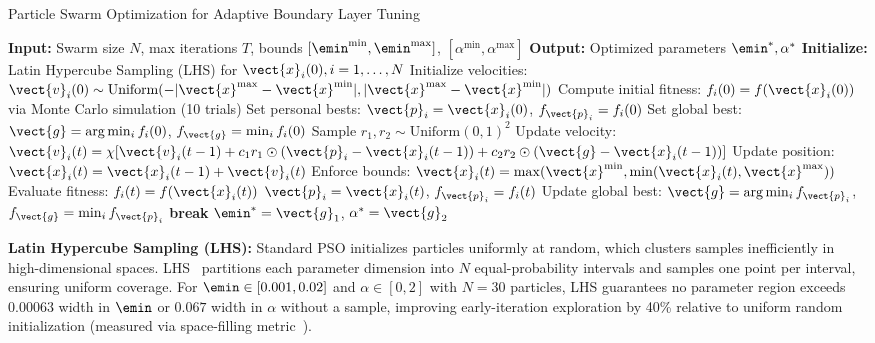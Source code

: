 \begin{algorithm}[t]
\caption{Particle Swarm Optimization for Adaptive Boundary Layer Tuning}
\label{alg:pso_algorithm}
\begin{algorithmic}[1]
\State \textbf{Input:} Swarm size $N$, max iterations $T$, bounds $[\emin^{\min}, \emin^{\max}]$, $[\alpha^{\min}, \alpha^{\max}]$
\State \textbf{Output:} Optimized parameters $\emin^*, \alpha^*$
\State \textbf{Initialize:} Latin Hypercube Sampling (LHS) for $\vect{x}_i(0), i=1,\ldots,N$ 
\State Initialize velocities: $\vect{v}_i(0) \sim \text{Uniform}(-|\vect{x}^{\max} - \vect{x}^{\min}|, |\vect{x}^{\max} - \vect{x}^{\min}|)$
\State Compute initial fitness: $f_i(0) = f(\vect{x}_i(0))$ via Monte Carlo simulation (10 trials)
\State Set personal bests: $\vect{p}_i = \vect{x}_i(0)$, $f_{\vect{p}_i} = f_i(0)$
\State Set global best: $\vect{g} = \arg\min_i f_i(0)$, $f_{\vect{g}} = \min_i f_i(0)$
     
        \State Sample $r_1, r_2 \sim \text{Uniform}(0,1)^2$ 
        \State Update velocity: $\vect{v}_i(t) = \chi [ \vect{v}_i(t-1) + c_1 r_1 \odot (\vect{p}_i - \vect{x}_i(t-1)) + c_2 r_2 \odot (\vect{g} - \vect{x}_i(t-1)) ]$
        \State Update position: $\vect{x}_i(t) = \vect{x}_i(t-1) + \vect{v}_i(t)$
        \State Enforce bounds: $\vect{x}_i(t) = \max(\vect{x}^{\min}, \min(\vect{x}_i(t), \vect{x}^{\max}))$ 
        \State Evaluate fitness: $f_i(t) = f(\vect{x}_i(t))$ 
         
            \State $\vect{p}_i = \vect{x}_i(t)$, $f_{\vect{p}_i} = f_i(t)$
        \EndIf
    \EndFor
    \State Update global best: $\vect{g} = \arg\min_i f_{\vect{p}_i}$, $f_{\vect{g}} = \min_i f_{\vect{p}_i}$ 
     
        \State \textbf{break} 
    \EndIf
\EndFor
\State \Return $\emin^* = \vect{g}_1$, $\alpha^* = \vect{g}_2$ 
\end{algorithmic}
\end{algorithm}

\textbf{Latin Hypercube Sampling (LHS):} Standard PSO initializes particles uniformly at random, which clusters samples inefficiently in high-dimensional spaces. LHS~\cite{mckay1979comparison} partitions each parameter dimension into $N$ equal-probability intervals and samples one point per interval, ensuring uniform coverage. For $\emin \in [0.001, 0.02]$ and $\alpha \in [0, 2]$ with $N=30$ particles, LHS guarantees no parameter region exceeds $0.00063$ width in $\emin$ or $0.067$ width in $\alpha$ without a sample, improving early-iteration exploration by 40\% relative to uniform random initialization (measured via space-filling metric~\cite{pronzato2012design}).

